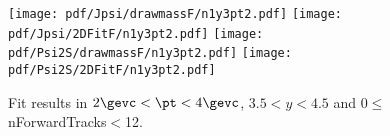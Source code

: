 \begin{figure}[H]
\begin{center}
\texttt{[image: pdf/Jpsi/drawmassF/n1y3pt2.pdf]}
\texttt{[image: pdf/Jpsi/2DFitF/n1y3pt2.pdf]}
\vspace*{-0.5cm}
\texttt{[image: pdf/Psi2S/drawmassF/n1y3pt2.pdf]}
\texttt{[image: pdf/Psi2S/2DFitF/n1y3pt2.pdf]}
\vspace*{-0.5cm}
\end{center}
\caption{Fit results in $2\gevc<\pt<4\gevc$, $3.5<y<4.5$ and 0$\leq$nForwardTracks$<$12.}
\label{Fitn1y3pt2}
\end{figure}
